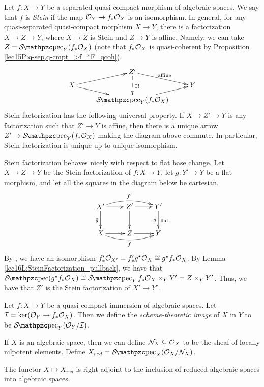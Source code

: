  \begin{example}
   Let $f:X\to Y$ be a separated quasi-compact morphism of algebraic spaces. We say that
   $f$ is \emph{Stein} if the map $\mathcal{O}_Y\to f_*\mathcal{O}_X$ is an isomorphism. In general, for
   any quasi-separated quasi-compact morphism $X\to Y$, there is a factorization $X\to
   Z\to Y$, where $X\to Z$ is Stein and $Z\to Y$ is affine. Namely, we can take
   $Z=\Spec_Y(f_*\O_X)$ (note that $f_*\mathcal{O}_X$ is quasi-coherent by Proposition
   \ref{lec15P:q-sep,q-cmpt=>f_*F_qcoh}).
   \[\xymatrix@R-1.5pc{
    & Z'\ar[dr]^{\text{affine}}\ar@{-->}[dd]^{\exists!}\\
    X \ar[ur]\ar[dr] & & Y\\
    & \Spec_Y(f_*\O_X)\ar[ur]
   }\]
    Stein factorization has the following universal property. If $X\to
   Z'\to Y$ is any factorization such that $Z'\to Y$ is affine, then there is a unique
   arrow $Z'\to \Spec_Y(f_*\O_X)$ making the diagram above commute. In particular, Stein
   factorization is unique up to unique isomorphism.
 \end{example}
 \begin{remark} \label{lec16R:flat_extension_Stein}
   Stein factorization behaves nicely with respect to flat base change. Let $X\to Z \to
   Y$ be the Stein factorization of $f:X\to Y$, let $g:Y'\to Y$ be a flat morphism, and
   let all the squares in the diagram below be cartesian.
   \[\xymatrix{
    X'\ar[r]\ar[d]_{\tilde g}\ar@/^2ex/[rr]^{f'} & Z'\ar[r]\ar[d] & Y'\ar[d]_g^{\text{flat}}\\
    X \ar[r] \ar@/_2ex/[rr]_f & Z\ar[r] & Y
   }\]
    By \cite[III.9.3]{Hartshorne}, we have an isomorphism $f'_* \tilde {\mathcal{O}}_{X'}=f'_*\tilde
   g^\star \mathcal{O}_X \cong g^\star f_*\mathcal{O}_X$. By Lemma
   \ref{lec16L:SteinFactorization_pullback}, we have that $\Spec (g^\star f_*\O_X)\cong
   \Spec_Y f_*\O_X \times_Y Y'= Z\times_Y Y'$. Thus, we have that $Z'$ is the Stein
   factorization of $X'\to Y'$.
 \end{remark}
 \begin{example}
   Let $f:X\to Y$ be a quasi-compact immersion of algebraic spaces. Let $\mathcal{I}=\ker(\mathcal{O}_Y\to
   f_*\mathcal{O}_X)$. Then we define the \emph{scheme-theoretic image} of $X$ in $Y$ to be
   $\Spec_Y (\O_Y/\I)$.
 \end{example}
 \begin{example}
   If $X$ is an algebraic space, then we can define
   $\mathcal{N}_X\subseteq \mathcal{O}_X$ to be the sheaf of locally nilpotent elements. Define
   $X_{red}=\Spec_X (\O_X/\N_X)$.

   The functor $X\mapsto X_{red}$ is right adjoint to the inclusion of reduced algebraic
   spaces into algebraic spaces.
 \end{example}

